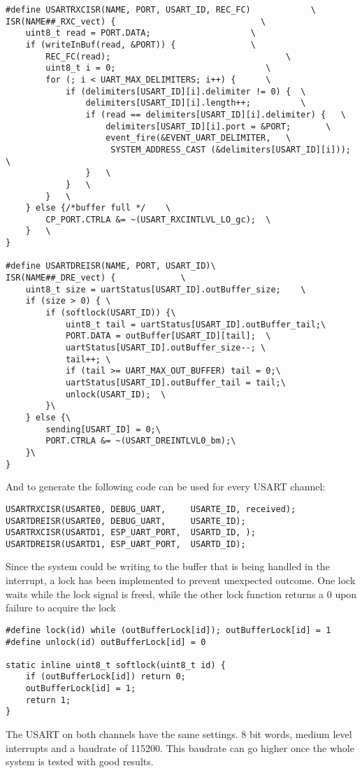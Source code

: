 \begin{verbatim}
#define USARTRXCISR(NAME, PORT, USART_ID, REC_FC)            \
ISR(NAME##_RXC_vect) {                             \
	uint8_t read = PORT.DATA;                    \
	if (writeInBuf(read, &PORT)) {               \
		REC_FC(read);                                   \
		uint8_t i = 0;                              \
		for (; i < UART_MAX_DELIMITERS; i++) {      \
			if (delimiters[USART_ID][i].delimiter != 0) {  \
				delimiters[USART_ID][i].length++;          \
				if (read == delimiters[USART_ID][i].delimiter) {   \
					delimiters[USART_ID][i].port = &PORT;       \
					event_fire(&EVENT_UART_DELIMITER,	\
					 SYSTEM_ADDRESS_CAST (&delimiters[USART_ID][i])); \
				}   \
			}   \
		}   \
	} else {/*buffer full */    \
		CP_PORT.CTRLA &= ~(USART_RXCINTLVL_LO_gc);  \
	}   \
}

#define USARTDREISR(NAME, PORT, USART_ID)\
ISR(NAME##_DRE_vect) {             \
	uint8_t size = uartStatus[USART_ID].outBuffer_size;    \
	if (size > 0) { \
		if (softlock(USART_ID)) {\
			uint8_t tail = uartStatus[USART_ID].outBuffer_tail;\
			PORT.DATA = outBuffer[USART_ID][tail];  \
			uartStatus[USART_ID].outBuffer_size--; \
			tail++; \
			if (tail >= UART_MAX_OUT_BUFFER) tail = 0;\
			uartStatus[USART_ID].outBuffer_tail = tail;\
			unlock(USART_ID);  \
		}\
	} else {\
		sending[USART_ID] = 0;\
		PORT.CTRLA &= ~(USART_DREINTLVL0_bm);\
	}\
}
\end{verbatim}
And to generate the following code can be used for every USART channel:
\begin{verbatim}
USARTRXCISR(USARTE0, DEBUG_UART,     USARTE_ID, received);
USARTDREISR(USARTE0, DEBUG_UART,     USARTE_ID);
USARTRXCISR(USARTD1, ESP_UART_PORT,  USARTD_ID, );
USARTDREISR(USARTD1, ESP_UART_PORT,  USARTD_ID);
\end{verbatim}
Since the system could be writing to the buffer that is being handled in the interrupt, a lock has been implemented to prevent unexpected outcome. One lock waits while the lock signal is freed, while the other lock function returns a 0 upon failure to acquire the lock
\begin{verbatim}
#define lock(id) while (outBufferLock[id]); outBufferLock[id] = 1
#define unlock(id) outBufferLock[id] = 0

static inline uint8_t softlock(uint8_t id) {
	if (outBufferLock[id]) return 0;
	outBufferLock[id] = 1;
	return 1;
}
\end{verbatim}
The USART on both channels have the same settings. 8 bit words, medium level interrupts and a baudrate of 115200. This baudrate can go higher once the whole system is tested with good results.
